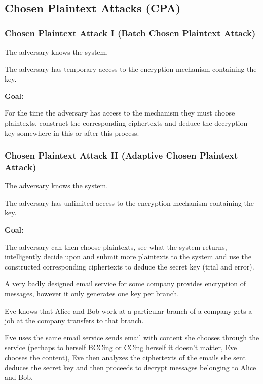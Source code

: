 \subsection{Chosen Plaintext Attacks (CPA)}

\subsubsection*{Chosen Plaintext Attack I (Batch Chosen Plaintext Attack)}

\begin{asu}
    The adversary knows the system.
\end{asu}

\begin{asu}
The adversary has temporary access to the encryption mechanism containing the key.
\end{asu}

\textbf{Goal:} 

For the time the adversary has access to the mechanism they must choose plaintexts, construct the corresponding ciphertexts and deduce the decryption key somewhere in this or after this process.



\subsubsection*{Chosen Plaintext Attack II (Adaptive Chosen Plaintext Attack)}

\begin{asu}
The adversary knows the system.
\end{asu}

\begin{asu}
The adversary has unlimited access to the encryption mechanism containing the key.
\end{asu}

\textbf{Goal:} 

The adversary can then choose plaintexts, see what the system returns, intelligently decide upon and submit more plaintexts to the system and use the constructed corresponding ciphertexts to deduce the secret key (trial and error).

\begin{exmp}

A very badly designed email service for some company provides encryption of messages, however it only generates one key per branch.

Eve knows that Alice and Bob work at a particular branch of a company gets a job at the company transfers to that branch. 

Eve uses the same email service sends email with content she chooses through the service (perhaps to herself BCCing or CCing herself it doesn’t matter, Eve chooses the content), Eve then analyzes the ciphertexts of the emails she sent deduces the secret key and then proceeds to decrypt messages belonging to Alice and Bob. 
\end{exmp}



